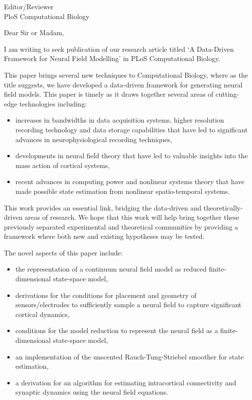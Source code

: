 \documentclass[a4paper,10pt]{letter}
\begin{document}
\begin{letter}{Editor/Reviewer \\ PloS Computational Biology}

\opening{Dear Sir or Madam,}




I am writing to seek publication of our research article titled `A Data-Driven Framework for Neural Field Modelling' in PLoS Computational Biology.

This paper brings several new techniques to Computational Biology, where as the title suggests, we have developed a data-driven framework for generating neural field models. This paper is timely as it draws together several areas of cutting-edge technologies including:
\begin{itemize}
	\item increases in bandwidths in data acquisition systems, higher resolution recording technology and data storage capabilities that have led to significant advances in neurophysiological recording techniques, 
	\item developments in neural field theory that have led to valuable insights into the mass action of cortical systems,
	\item recent advances in computing power and nonlinear systems theory that have made possible state estimation from nonlinear spatio-temporal systems.
\end{itemize}

This work provides an essential link, bridging the data-driven and theoretically-driven areas of research. We hope that this work will help bring together these previously separated experimental and theoretical communities by providing a framework where both new and existing hypotheses may be tested.

The novel aspects of this paper include:
\begin{itemize}
	\item the representation of a continuum neural field model as reduced finite-dimensional state-space model,
	\item derivations for the conditions for placement and geometry of sensors/electrodes to sufficiently sample a neural field to capture significant cortical dynamics,
	\item conditions for the model reduction to represent the neural field as a finite-dimensional state-space model,
	\item an implementation of the unscented Rauch-Tung-Striebel smoother for state estimation,
	\item a derivation for an algorithm for estimating intracortical connectivity and synaptic dynamics using the neural field equations.
\end{itemize}


\end{letter}
\end{document}
